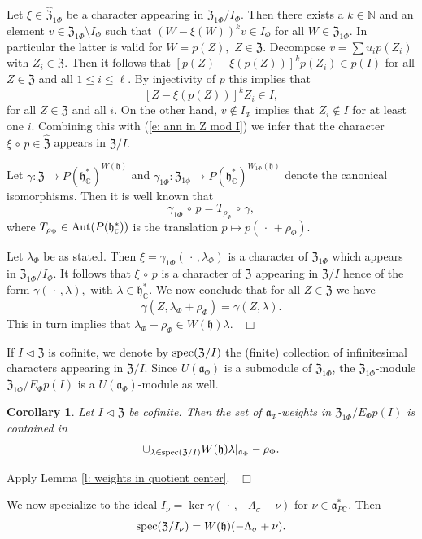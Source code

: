 \documentclass[12pt,a4paper]{article}
\newtheorem{Cor}[Thm]{Corollary}
\newenvironment{cor}[0]{\begin{Cor}\noindent}%
{\end{Cor}}
\def\proof{\par\noindent{\it Proof.}{\ }{\ }}
\def\qed{~\hfill\hbox{$\Box$}\medbreak}
\def\msy#1{{\mathbb #1}}
\def\C{{\msy C}}
\def\N{{\msy N}}
\def\gg{\gamma}
\def\gl{\lambda}
\def\gs{\sigma}
\def\got#1{\mathfrak #1}
\def\fa{{\got a}}
\def\fh{{\got h}}
\def\to{\rightarrow}
\def\after{\,{\scriptstyle\circ}\,}
\def\iC{{\scriptscriptstyle \C}}
\numberwithin{Thm}{section}
\numberwithin{equation}{section}
\def\dotvar{\, \cdot\,}
\def\fZ{{\mathfrak Z}}
\def\faPdc{{\fa_{P\iC}^*}}
\def\gL{\Lambda}
\def\fhdc{\fh_\iC^*}
\numberwithin{equation}{section}
\def\fZ{{\mathfrak Z}}
\def\gL{\Lambda}
\def\fhdc{\fh_\iC^*}
\def\spec{{\rm spec}}
\def\faPdc{\fa_{P\iC}^*}
\def\fh{{\mathfrak h}}
\def\ideal{\vartriangleleft }
\def\spec{{\rm spec}}
\begin{document}
Let $\xi \in \widehat \fZ_{1\Phi}$ be a character appearing in $\fZ_{1\Phi}/I_{\Phi}.$ 
Then there exists a $k \in \N$ and an element $v\in \fZ_{1\Phi}\setminus I_\Phi$ 
such that $(W - \xi(W))^{k}v \in I_\Phi$ for all $W \in \fZ_{1\Phi}.$ In particular
the latter is valid for $W = p(Z),$ $Z \in \fZ.$ Decompose $v = \sum u_i p(Z_i)$ 
with $Z_i \in \fZ.$ Then it follows that $[p(Z) - \xi(p(Z))]^k p(Z_i) \in p(I)$ for all $Z \in \fZ$
and all $1\leq i \leq \ell.$ By injectivity of $p$ this implies that 
\begin{equation}
\label{e: ann in Z mod I}
[Z - \xi(p(Z))]^k Z_i \in I,
\end{equation}
for all $Z \in \fZ$ and all $i.$  
On the other hand,  $v \notin I_{\Phi}$ implies that $Z_i \notin I$ for at least one $i.$
Combining this with (\ref{e: ann in Z mod I})  we infer that  the character $\xi\after p \in \widehat \fZ$ 
appears in $\fZ / I.$ 

Let $\gg: \fZ \to P(\fhdc)^{W(\fh)}$ and $\gg_{1\Phi}: \fZ_{1\phi} \to P(\fhdc)^{W_{1\Phi}(\fh)}$ 
denote the canonical isomorphisms. Then it is well known that 
$$ 
\gg_{1\Phi} \after p = T_{\rho_{\Phi}} \after \gg,
$$ 
where $T_{\rho_\Phi}\in {\rm Aut}(P(\fhdc))$ is the translation $p\mapsto p(\dotvar + \rho_\Phi).$ 

Let $\gl_\Phi$ be as stated. Then $\xi = \gg_{1\Phi} (\dotvar, \gl_{\Phi})$ 
is a character of $\fZ_{1\Phi}$ which appears in $\fZ_{1\Phi} /I_\Phi.$ 
It follows that $\xi \after p$ is a character of $\fZ$ appearing in $\fZ / I$ 
hence of the form $\gg(\dotvar, \gl),$ with $\gl \in \fhdc.$ 
We now conclude that for all $Z \in \fZ$ we have
$$ 
\gg(Z, \gl_\Phi + \rho_\Phi) = \gg(Z, \gl).
$$ 
This in turn implies that $\gl_\Phi + \rho_{\Phi} \in W(\fh) \gl.$
\qed



If $I \ideal \fZ$ is cofinite, we denote by $\spec(\fZ/I)$ the (finite) collection
of infinitesimal characters appearing in $\fZ/I.$ Since $U(\fa_\Phi)$ is a submodule
of $\fZ_{1\Phi}$, the $\fZ_{1\Phi}$-module $\fZ_{1\Phi}/ E_\Phi p(I)$ 
is a $U(\fa_\Phi)$-module as well. 

\begin{cor}
Let $I \ideal \fZ$ be cofinite. Then the set of $\fa_\Phi$-weights in 
$\fZ_{1\Phi}/ E_\Phi p(I) $ is contained in 
$$ 
\cup_{\gl \in \spec (\fZ/I)} W(\fh) \gl |_{\fa_\Phi} - \rho_\Phi.
$$ 
\end{cor}
\proof 
Apply Lemma \ref{l: weights in quotient center}.
\qed

We now specialize to the ideal $I_{\nu} = \ker \gg(\dotvar, - \gL_\gs + \nu)$ for 
$\nu \in \faPdc.$ Then 
$$
\spec(\fZ / I_\nu) = W(\fh)(- \gL_\gs + \nu). $$
\end{document}

